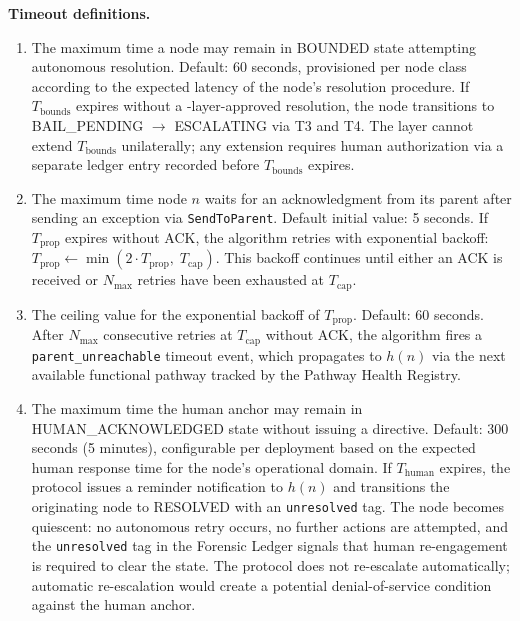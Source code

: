 \bigskip
\noindent\textbf{Timeout definitions.}

\begin{enumerate}\itemsep=0pt
\item[\textbf{$T_{\text{bounds}}$ --- Bounds Engine resolution timeout.}] The maximum time a node may remain in BOUNDED state attempting autonomous resolution. Default: 60 seconds, provisioned per node class according to the expected latency of the node's resolution procedure. If $T_{\text{bounds}}$ expires without a \fact-layer-approved resolution, the node transitions to BAIL\_PENDING $\rightarrow$ ESCALATING via T3 and T4. The \fact{} layer cannot extend $T_{\text{bounds}}$ unilaterally; any extension requires human authorization via a separate ledger entry recorded before $T_{\text{bounds}}$ expires.

\item[\textbf{$T_{\text{prop}}$ --- Per-hop propagation timeout.}] The maximum time node $n$ waits for an acknowledgment from its parent after sending an exception via \texttt{SendToParent}. Default initial value: 5 seconds. If $T_{\text{prop}}$ expires without ACK, the algorithm retries with exponential backoff: $T_{\text{prop}} \leftarrow \min(2 \cdot T_{\text{prop}},\; T_{\text{cap}})$. This backoff continues until either an ACK is received or $N_{\max}$ retries have been exhausted at $T_{\text{cap}}$.

\item[\textbf{$T_{\text{cap}}$ --- Maximum propagation timeout value.}] The ceiling value for the exponential backoff of $T_{\text{prop}}$. Default: 60 seconds. After $N_{\max}$ consecutive retries at $T_{\text{cap}}$ without ACK, the algorithm fires a \texttt{parent\_unreachable} timeout event, which propagates to $h(n)$ via the next available functional pathway tracked by the Pathway Health Registry.

\item[\textbf{$T_{\text{human}}$ --- Human acknowledgment timeout.}] The maximum time the human anchor may remain in HUMAN\_ACKNOWLEDGED state without issuing a directive. Default: 300 seconds (5 minutes), configurable per deployment based on the expected human response time for the node's operational domain. If $T_{\text{human}}$ expires, the protocol issues a reminder notification to $h(n)$ and transitions the originating node to RESOLVED with an \texttt{unresolved} tag. The node becomes quiescent: no autonomous retry occurs, no further actions are attempted, and the \texttt{unresolved} tag in the Forensic Ledger signals that human re-engagement is required to clear the state. The protocol does not re-escalate automatically; automatic re-escalation would create a potential denial-of-service condition against the human anchor.
\end{enumerate}

